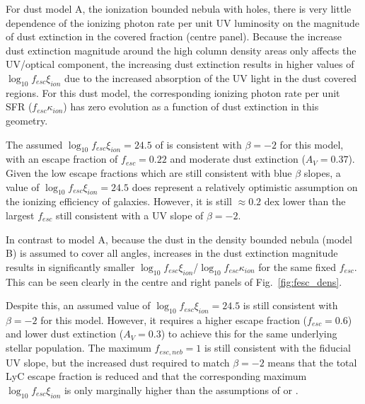 For dust model A, the ionization bounded nebula with holes, there is very little dependence of the ionizing photon rate per unit UV luminosity on the magnitude of dust extinction in the covered fraction (centre panel). Because the increase dust extinction magnitude around the high column density areas only affects the UV/optical component, the increasing dust extinction results in higher values of $\log_{10}f_{esc}\xi_{ion}$ due to the increased absorption of the UV light in the dust covered regions. For this dust model, the corresponding ionizing photon rate per unit SFR ($f_{esc}\kappa_{ion}$) has zero evolution as a function of dust extinction in this geometry.

The assumed  $\log_{10}f_{esc}\xi_{ion} = 24.5$ of \citet{Robertson:2013ji} is consistent with  $\beta  = -2$ for this model, with an escape fraction of $f_{esc} = 0.22$ and moderate dust extinction ($A_{V} = 0.37$). Given the low escape fractions which are still consistent with blue $\beta$ slopes, a value of $\log_{10}f_{esc}\xi_{ion} = 24.5$ does represent a relatively optimistic assumption on the ionizing efficiency of galaxies. However, it is still $\approx 0.2$ dex lower than the largest $f_{esc}$ still consistent with a UV slope of $\beta = -2$.

In contrast to model A, because the dust in the density bounded nebula (model B) is assumed to cover all angles, increases in the dust extinction magnitude results in significantly smaller $\log_{10}f_{esc}\xi_{ion}$/$\log_{10}f_{esc}\kappa_{ion}$ for the same fixed $f_{esc}$. This can be seen clearly in the centre and right panels of Fig.~\ref{fig:fesc_dens}.

Despite this, an assumed value of $\log_{10}f_{esc}\xi_{ion} = 24.5$ is still consistent with $\beta = -2$ for this model. However, it requires a higher escape fraction ($f_{esc} = 0.6$) and lower dust extinction ($A_{V} = 0.3$) to achieve this for the same underlying stellar population. The maximum $f_{esc,neb} = 1$ is still consistent with the fiducial UV slope, but the increased dust required to match $\beta = -2$ means that the total LyC escape fraction is reduced and that the corresponding maximum $\log_{10}f_{esc}\xi_{ion}$ is only marginally higher than the assumptions of \citep{Kuhlen:2012ka} or \citep{Robertson:2013ji}. 

